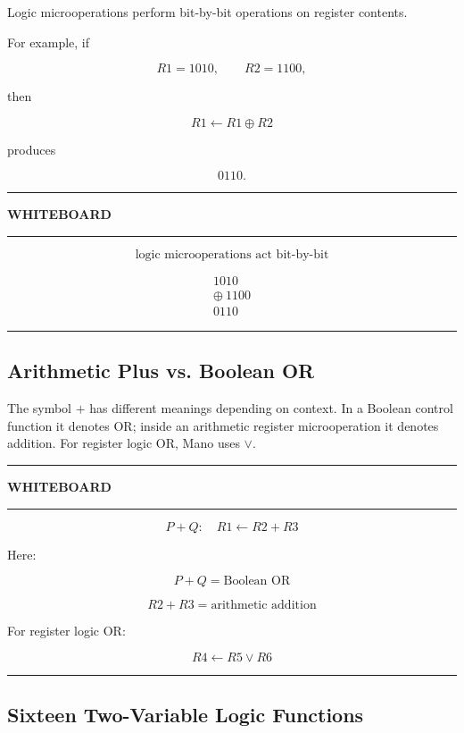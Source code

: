 \documentclass[11pt]{article}
\newenvironment{whiteboard}
{
    \par\medskip
    \hrule
    \vspace{0.35em}
    \noindent\textbf{\large WHITEBOARD}
    \par\vspace{0.3em}
    \hrule
    \vspace{0.65em}
}
{
    \vspace{0.45em}
    \hrule
    \par\medskip
}
\begin{document}
Logic microoperations perform bit-by-bit operations on register contents.

For example, if

\[
R1=1010,
\qquad
R2=1100,
\]

then

\[
R1\leftarrow R1\oplus R2
\]

produces

\[
0110.
\]

\begin{whiteboard}

\[
\boxed{\text{logic microoperations act bit-by-bit}}
\]

\[
\begin{array}{r}
1010\\
\oplus\ 1100\\
\hline
0110
\end{array}
\]

\end{whiteboard}

\subsection{Arithmetic Plus vs. Boolean OR}

The symbol $+$ has different meanings depending on context. In a Boolean control function it denotes OR; inside an arithmetic register microoperation it denotes addition. For register logic OR, Mano uses $\vee$.

\begin{whiteboard}

\[
P+Q:\quad R1\leftarrow R2+R3
\]

Here:

\[
\boxed{P+Q=\text{Boolean OR}}
\]

\[
\boxed{R2+R3=\text{arithmetic addition}}
\]

For register logic OR:

\[
\boxed{R4\leftarrow R5\vee R6}
\]

\end{whiteboard}

\subsection{Sixteen Two-Variable Logic Functions}
\end{document}
